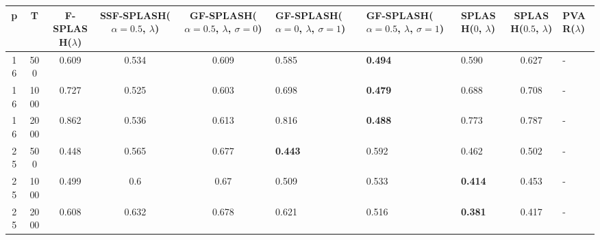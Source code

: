 \begin{tabular}{ccccclllcl}
\hline
  p  &  T   &  F-SPLASH($\lambda$)  &  SSF-SPLASH($\alpha=0.5$, $\lambda$)  &  GF-SPLASH($\alpha=0.5$, $\lambda$, $\sigma=0$)  & GF-SPLASH($\alpha=0$, $\lambda$, $\sigma=1$)   & GF-SPLASH($\alpha=0.5$, $\lambda$, $\sigma=1$)   & SPLASH($0$, $\lambda$)   &  SPLASH($0.5$, $\lambda$)  & PVAR($\lambda$)   \\
\hline
 16  & 500  &         0.609         &                 0.534                 &                      0.609                       & 0.585                                          & \textbf{0.494}                                   & 0.590                    &           0.627            & -                 \\
 16  & 1000 &         0.727         &                 0.525                 &                      0.603                       & 0.698                                          & \textbf{0.479}                                   & 0.688                    &           0.708            & -                 \\
 16  & 2000 &         0.862         &                 0.536                 &                      0.613                       & 0.816                                          & \textbf{0.488}                                   & 0.773                    &           0.787            & -                 \\
 25  & 500  &         0.448         &                 0.565                 &                      0.677                       & \textbf{0.443}                                 & 0.592                                            & 0.462                    &           0.502            & -                 \\
 25  & 1000 &         0.499         &                  0.6                  &                       0.67                       & 0.509                                          & 0.533                                            & \textbf{0.414}           &           0.453            & -                 \\
 25  & 2000 &         0.608         &                 0.632                 &                      0.678                       & 0.621                                          & 0.516                                            & \textbf{0.381}           &           0.417            & -                 \\
\hline
\end{tabular}